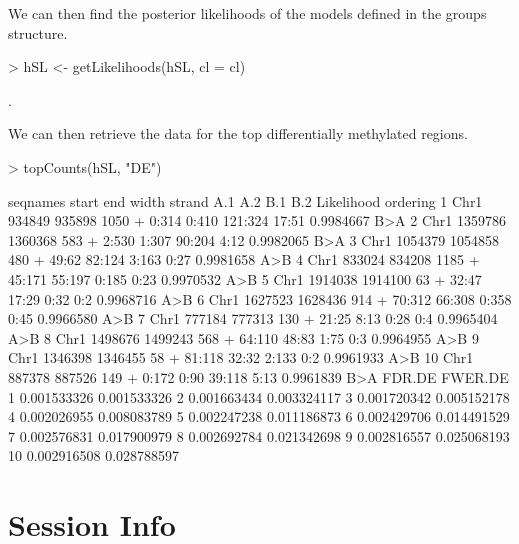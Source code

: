 \documentclass[a4paper]{article}
\begin{document}
We can then find the posterior likelihoods of the models defined in the groups structure.

\begin{Schunk}
\begin{Sinput}
> hSL <- getLikelihoods(hSL, cl = cl)
\end{Sinput}
\begin{Soutput}
.
\end{Soutput}
\end{Schunk}

We can then retrieve the data for the top differentially methylated regions.

\begin{Schunk}
\begin{Sinput}
> topCounts(hSL, "DE")
\end{Sinput}
\begin{Soutput}
   seqnames   start     end width strand    A.1    A.2     B.1   B.2 Likelihood ordering
1      Chr1  934849  935898  1050      +  0:314  0:410 121:324 17:51  0.9984667      B>A
2      Chr1 1359786 1360368   583      +  2:530  1:307  90:204  4:12  0.9982065      B>A
3      Chr1 1054379 1054858   480      +  49:62 82:124   3:163  0:27  0.9981658      A>B
4      Chr1  833024  834208  1185      + 45:171 55:197   0:185  0:23  0.9970532      A>B
5      Chr1 1914038 1914100    63      +  32:47  17:29    0:32   0:2  0.9968716      A>B
6      Chr1 1627523 1628436   914      + 70:312 66:308   0:358  0:45  0.9966580      A>B
7      Chr1  777184  777313   130      +  21:25   8:13    0:28   0:4  0.9965404      A>B
8      Chr1 1498676 1499243   568      + 64:110  48:83    1:75   0:3  0.9964955      A>B
9      Chr1 1346398 1346455    58      + 81:118  32:32   2:133   0:2  0.9961933      A>B
10     Chr1  887378  887526   149      +  0:172   0:90  39:118  5:13  0.9961839      B>A
        FDR.DE     FWER.DE
1  0.001533326 0.001533326
2  0.001663434 0.003324117
3  0.001720342 0.005152178
4  0.002026955 0.008083789
5  0.002247238 0.011186873
6  0.002429706 0.014491529
7  0.002576831 0.017900979
8  0.002692784 0.021342698
9  0.002816557 0.025068193
10 0.002916508 0.028788597
\end{Soutput}
\end{Schunk}

\section*{Session Info}
\end{document}
